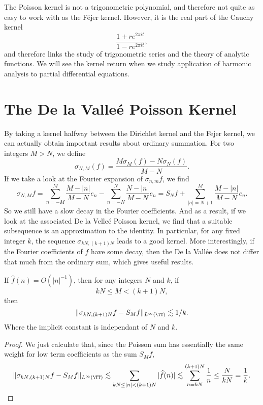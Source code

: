 The Poisson kernel is not a trigonometric polynomial, and therefore not quite as easy to work with as the F\'{e}jer kernel. However, it is the real part of the Cauchy kernel
%
\[ \frac{1 + re^{2 \pi it}}{1 - re^{2 \pi it}}, \]
%
and therefore links the study of trigonometric series and the theory of analytic functions. We will see the kernel return when we study application of harmonic analysis to partial differential equations.

\section{The De la Valle\'{e} Poisson Kernel}

By taking a kernel halfway between the Dirichlet kernel and the Fejer kernel, we can actually obtain important results about ordinary summation. For two integers $M > N$, we define
%
\[ \sigma_{N,M}(f) = \frac{M\sigma_M(f) - N\sigma_N(f)}{M-N}. \]
%
If we take a look at the Fourier expansion of $\sigma_{n,m} f$, we find
%
\[ \sigma_{N,M} f = \sum_{n = -M}^M \frac{M - |n|}{M-N} e_n - \sum_{n = -N}^N \frac{N - |n|}{M-N} e_n = S_N f + \sum_{|n| = N+1}^M \frac{M - |n|}{M - N} e_n. \]
%
So we still have a slow decay in the Fourier coefficients. And as a result, if we look at the associated De la Velle\'{e} Poisson kernel, we find that a suitable subsequence is an approximation to the identity. In particular, for any fixed integer $k$, the sequence $\sigma_{kN,(k+1)N}$ leads to a good kernel. More interestingly, if the Fourier coefficients of $f$ have some decay, then the De la Vall\'{e}e does not differ that much from the ordinary sum, which gives useful results.

\begin{theorem}
    If $\widehat{f}(n) = O(|n|^{-1})$, then for any integers $N$ and $k$, if
    \[ kN \leq M < (k+1)N, \]
    then
    \[ \| \sigma_{kN,(k+1)N} f - S_M f \|_{L^\infty(\TT)} \lesssim 1/k. \]
    Where the implicit constant is independant of $N$ and $k$.
\end{theorem}
\begin{proof}
    We just calculate that, since the Poisson sum has essentially the same weight for low term coefficients as the sum $S_M f$,
    \[ \| \sigma_{kN,(k+1)N} f - S_M f \|_{L^\infty(\TT)} \lesssim \sum_{kN \leq |n| < (k+1)N} |\widehat{f}(n)| \lesssim \sum_{n = kN}^{(k+1)N} \frac{1}{n} \leq \frac{N}{kN} = \frac{1}{k}. \qedhere \]
\end{proof}

